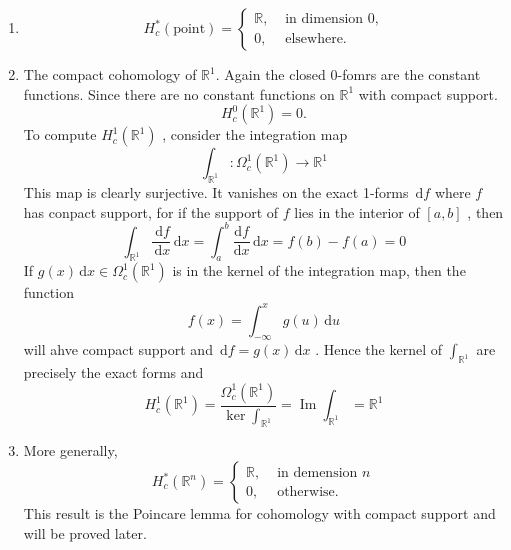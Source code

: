 \documentclass[../main.tex]{subfiles}
\begin{document}
\begin{example}{}{}
    \begin{enumerate}
        \item \[
        H_{c}^{*}\left( \mathrm{point} \right)  = \begin{cases} \mathbb{R} ,& \text{ in dimension 0} , \\ 
         0,& \text{ elsewhere.} \end{cases} 
        \]
        \item The compact cohomology of \(  \mathbb{R} ^{1}  \). Again the closed 0-fomrs are the constant functions. Since there are no constant functions on \(  \mathbb{R} ^{1}  \) with compact support.  \[
        H_{c}^{0}\left( \mathbb{R} ^{1} \right)= 0.  
        \] To compute \(  H_{c}^{1}\left( \mathbb{R} ^{1} \right)   \) , consider the integration map \[
        \int_{\mathbb{R} ^{1}}:  \Omega _{c}^{1}\left( \mathbb{R} ^{1} \right)\to \mathbb{R} ^{1} 
        \]   This map is clearly surjective. It vanishes on the exact 1-forms \(  \,\mathrm{d} f  \) where \(  f  \) has conpact support, for if the support of \(  f  \)    lies in the interior of \(  \left[ a,b \right]   \) , then \[
        \int_{\mathbb{R} ^{1}} \frac{\,\mathrm{d} f }{\,\mathrm{d} x }\,\mathrm{d} x= \int_{a}^{b}\frac{\mathrm{d}f}{\mathrm{d}x} \,\mathrm{d} x= f\left( b \right)-f\left( a \right)= 0   
        \]  If \(  g\left( x \right)\,\mathrm{d} x\in  \Omega _{c}^{1}\left( \mathbb{R} ^{1} \right)    \) is in the kernel of the integration map, then the function \[
        f\left( x \right)= \int_{-\infty}^{x}g\left( u \right)\,\mathrm{d} u  
        \] will ahve compact support and \(  \,\mathrm{d} f= g\left( x \right)\,\mathrm{d} x   \)  . Hence the kernel of \(  \int_{\mathbb{R} ^{1}}  \)  are precisely the exact forms and \[
        H_{c}^{1}\left( \mathbb{R} ^{1} \right)= \frac{ \Omega _{c}^{1}\left( \mathbb{R} ^{1} \right)  }{ \operatorname{ker}\int_{\mathbb{R} ^{1}} }= \operatorname{Im}\int_{\mathbb{R} ^{1}}  = \mathbb{R} ^{1}
        \]
        \item More generally, \[
        H_{c}^{*}\left( \mathbb{R} ^{n} \right)= \begin{cases} \mathbb{R} ,& \text{ in demension }n\\ 
         0,& \text{ otherwise. } \end{cases}  
        \] This result is the Poincare lemma for cohomology with compact support and will be proved later. 
    \end{enumerate}
    
\end{example}
\end{document}
